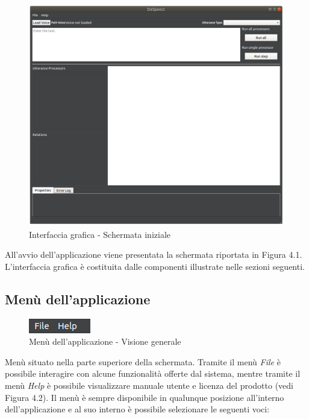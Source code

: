 \documentclass[openany,12pt,a4paper]{report}
\begin{document}
	\begin{figure}[H]
		
		\centering
		
		\includegraphics[scale=0.3]{./img/main-window}
		
		\caption{Interfaccia grafica - Schermata iniziale}
	
	\end{figure}

	All'avvio dell'applicazione viene presentata la schermata riportata in Figura 4.1. L'interfaccia grafica è costituita dalle componenti illustrate nelle sezioni seguenti.
 	
 	\subsection{Menù dell'applicazione}
 	
 	\begin{figure}[H]
 		
 		\centering
 		
 		\includegraphics{./img/menu}
 		
 		\caption{Menù dell'applicazione - Visione generale}
 		
 	\end{figure}
 
 	Menù situato nella parte superiore della schermata. Tramite il menù \textit{File} è possibile interagire con alcune funzionalità offerte dal sistema, mentre tramite il menù \textit{Help} è possibile visualizzare manuale utente e licenza del prodotto (vedi Figura 4.2). Il menù è sempre disponibile in qualunque posizione all'interno dell'applicazione e al suo interno è possibile selezionare le seguenti voci:
 	
\end{document}
